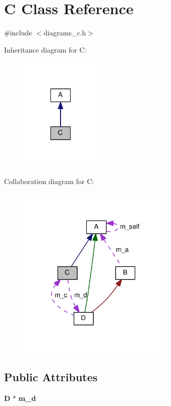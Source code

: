 \section{C Class Reference}
\label{class_c}


{\ttfamily \#include $<$diagrams\-\_\-c.\-h$>$}



Inheritance diagram for C\-:\nopagebreak
\begin{figure}[H]
\begin{center}
\leavevmode
\includegraphics[width=108pt]{class_c__inherit__graph}
\end{center}
\end{figure}


Collaboration diagram for C\-:\nopagebreak
\begin{figure}[H]
\begin{center}
\leavevmode
\includegraphics[width=212pt]{class_c__coll__graph}
\end{center}
\end{figure}
\subsection*{Public Attributes}
\begin{DoxyCompactItemize}
\item 
{\bf D} $\ast$ {\bf m\-\_\-d}
\end{DoxyCompactItemize}


